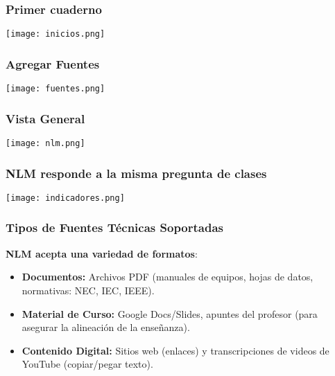 \documentclass[aspectratio=43]{beamer}
\begin{document}
\begin{frame}
  \frametitle{Primer cuaderno}
  \begin{center}
    \texttt{[image: inicios.png]}
  \end{center}
\end{frame}

\begin{frame}
  \frametitle{Agregar Fuentes}
  \begin{center}
    \texttt{[image: fuentes.png]}
  \end{center}
\end{frame}

\begin{frame}
  \frametitle{Vista General}
  \begin{center}
    \texttt{[image: nlm.png]}
  \end{center}
\end{frame}

\begin{frame}
  \frametitle{NLM responde a la misma pregunta de clases}
  \begin{center}
    \texttt{[image: indicadores.png]}
  \end{center}
\end{frame}

\begin{frame}
\frametitle{Tipos de Fuentes Técnicas Soportadas}

\textbf{NLM acepta una variedad de formatos}:
\begin{itemize}
    \item \textbf{Documentos:} Archivos PDF (manuales de equipos, hojas de datos, normativas: NEC, IEC, IEEE).
    \item \textbf{Material de Curso:} Google Docs/Slides, apuntes del profesor (para asegurar la alineación de la enseñanza).
    \item \textbf{Contenido Digital:} Sitios web (enlaces) y transcripciones de videos de YouTube (copiar/pegar texto).
\end{itemize}
\end{frame}
\end{document}
